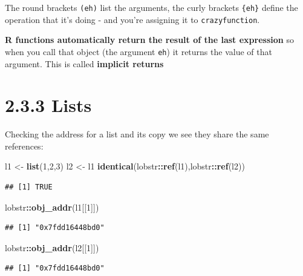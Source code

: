 \documentclass[]{book}
\newenvironment{Shaded}{\begin{snugshade}}{\end{snugshade}}
\newcommand{\DecValTok}[1]{\textcolor[rgb]{0.00,0.00,0.81}{#1}}
\newcommand{\KeywordTok}[1]{\textcolor[rgb]{0.13,0.29,0.53}{\textbf{#1}}}
\newcommand{\NormalTok}[1]{#1}
\newcommand{\OperatorTok}[1]{\textcolor[rgb]{0.81,0.36,0.00}{\textbf{#1}}}
\newcommand{\StringTok}[1]{\textcolor[rgb]{0.31,0.60,0.02}{#1}}
\begin{document}
The round brackets \texttt{(eh)} list the arguments, the curly brackets \texttt{\{eh\}} define the operation that it's doing - and you're assigning it to \texttt{crazyfunction}.

\textbf{R functions automatically return the result of the last expression} so when you call that object (the argument \texttt{eh}) it returns the value of that argument. This is called \textbf{implicit returns}

\hypertarget{lists}{%
\section*{2.3.3 Lists}\label{lists}}

Checking the address for a list and its copy we see they share the same references:

\begin{Shaded}
\begin{Highlighting}[]
\NormalTok{l1 <-}\StringTok{ }\KeywordTok{list}\NormalTok{(}\DecValTok{1}\NormalTok{,}\DecValTok{2}\NormalTok{,}\DecValTok{3}\NormalTok{)}
\NormalTok{l2 <-}\StringTok{ }\NormalTok{l1}
\KeywordTok{identical}\NormalTok{(lobstr}\OperatorTok{::}\KeywordTok{ref}\NormalTok{(l1),lobstr}\OperatorTok{::}\KeywordTok{ref}\NormalTok{(l2))}
\end{Highlighting}
\end{Shaded}

\begin{verbatim}
## [1] TRUE
\end{verbatim}

\begin{Shaded}
\begin{Highlighting}[]
\NormalTok{lobstr}\OperatorTok{::}\KeywordTok{obj_addr}\NormalTok{(l1[[}\DecValTok{1}\NormalTok{]])}
\end{Highlighting}
\end{Shaded}

\begin{verbatim}
## [1] "0x7fdd16448bd0"
\end{verbatim}

\begin{Shaded}
\begin{Highlighting}[]
\NormalTok{lobstr}\OperatorTok{::}\KeywordTok{obj_addr}\NormalTok{(l2[[}\DecValTok{1}\NormalTok{]])}
\end{Highlighting}
\end{Shaded}

\begin{verbatim}
## [1] "0x7fdd16448bd0"
\end{verbatim}
\end{document}
